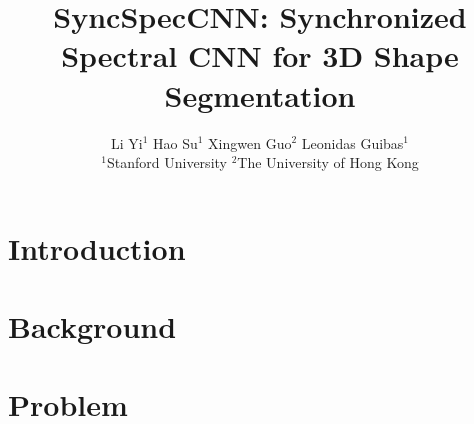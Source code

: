 \documentclass[10pt,twocolumn,letterpaper]{article}
\begin{document}
\title{SyncSpecCNN: Synchronized Spectral CNN for 3D Shape Segmentation}

\author{Li Yi$^1$ \qquad Hao Su$^1$ \qquad Xingwen Guo$^2$ \qquad Leonidas Guibas$^1$\\$^1$Stanford University \qquad $^2$The University of Hong Kong}

\iffalse
\author{Li Yi\\
Stanford University\\
{\tt\small ericyi@stanford.edu}
\and
Hao Su\\
Stanford University\\
{\tt\small haosu@cs.stanford.edu}
\and
Xingwen Guo\\
The University of Hong Kong\\
{\tt\small emily.xw.guo@gmail.com}
\and
Leonidas Guibas\\
Stanford University\\
{\tt\small guibas@cs.stanford.edu}
}
\fi


\maketitle

%
\begin{abstract}
  
\end{abstract}

\section{Introduction}


\section{Background}


\section{Problem}

\end{document}
